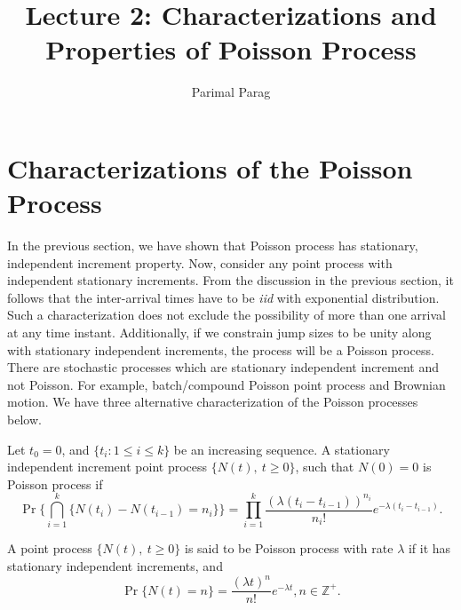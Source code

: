 \documentclass[a4paper,10pt]{article}
\title{Lecture 2: Characterizations and Properties of Poisson Process}
\author{Parimal Parag}
\begin{document}
\maketitle

\section{Characterizations of the Poisson Process}

In the previous section, we have shown that Poisson process has stationary, independent increment property. Now, consider any point process with independent stationary increments. From the discussion in the previous section, it follows that the inter-arrival times have to be \emph{iid} with exponential distribution. Such a characterization does not exclude the possibility of more than one arrival at any time instant. Additionally, if we constrain jump sizes to be unity along with stationary independent increments, the process will be a Poisson process. There are stochastic processes which are stationary independent increment and not Poisson. For example, batch/compound Poisson point process and Brownian motion. We have three alternative characterization of the Poisson processes below. 

\begin{defn}\label{defn:SIIJoint} Let $t_0 = 0$, and $\{t_i: 1 \leq i \leq k\}$ be an increasing sequence. A stationary independent increment point process $\{N(t),~t\geqslant 0\}$, such that $N(0) = 0$ is Poisson process if 
\begin{equation*}
  \Pr\{\bigcap_{i=1}^k \{N(t_i)-N(t_{i-1})= n_{i}\}\} = \prod_{i=1}^{k}\frac{(\lambda(t_{i}-t_{i-1}))^{n_{i}}}{n_{i}!} e^{-\lambda (t_{i}-t_{i-1})}.
\end{equation*}
\end{defn}

\begin{defn}\label{defn:SIIMarginal} A point process $\{N(t),~t\geqslant 0\}$ is said to be Poisson process with rate $\lambda$ if it has stationary independent increments, and 
\begin{equation*}
\Pr\{N(t)=n\}= \frac{(\lambda t)^{n}}{n!} e^{-\lambda t}, n\in \mathbb{Z}^+.
\end{equation*}
\end{defn}
\end{document}
